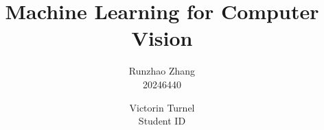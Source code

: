 \documentclass[10pt,twocolumn,letterpaper]{article}
\begin{document}
	
	\title{Machine Learning for Computer Vision}
	
	\author{Runzhao Zhang\\
		20246440\\
	\and
	Victorin Turnel\\
	Student ID\\
}
\maketitle

	\vspace{0.5cm}
	
	
	
	
	
	
\end{document}
